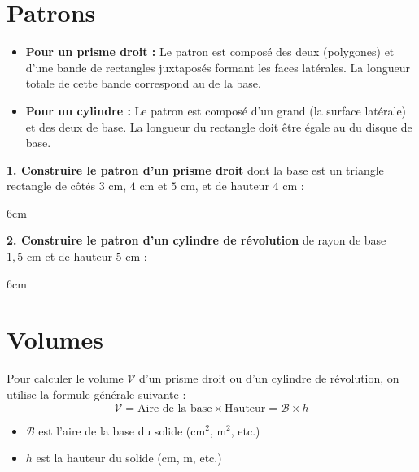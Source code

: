 \documentclass[a4paper]{book}
\begin{document}
\section{Patrons}

    \begin{methode}
        \begin{itemize}
            \item \textbf{Pour un prisme droit :} Le patron est composé des deux \points[5] (polygones) et d'une bande de rectangles juxtaposés formant les faces latérales. La longueur totale de cette bande correspond au \points[6] de la base.
            \item \textbf{Pour un cylindre :} Le patron est composé d'un grand \points[7] (la surface latérale) et des deux \points[5] de base. La longueur du rectangle doit être égale au \points[8] du disque de base.
        \end{itemize}
    \end{methode}

    \begin{exemple}
        \textbf{1. Construire le patron d'un prisme droit} dont la base est un triangle rectangle de côtés $3\text{ cm}$, $4\text{ cm}$ et $5\text{ cm}$, et de hauteur $4\text{ cm}$ :
    \end{exemple}
    \begin{ZoneReponse}{6cm}
    \end{ZoneReponse}

    \begin{exemple}
        \textbf{2. Construire le patron d'un cylindre de révolution} de rayon de base $1,5\text{ cm}$ et de hauteur $5\text{ cm}$ :
    \end{exemple}
    \begin{ZoneReponse}{6cm}
    \end{ZoneReponse}

\section{Volumes}

    \begin{propriete}
        Pour calculer le volume $\mathcal{V}$ d'un prisme droit ou d'un cylindre de révolution, on utilise la formule générale suivante :
        \[ \mathcal{V} = \text{Aire de la base} \times \text{Hauteur} = \mathcal{B} \times h \]
        \begin{itemize}
            \item $\mathcal{B}$ est l'aire de la base du solide ($\text{cm}^2$, $\text{m}^2$, etc.)
            \item $h$ est la hauteur du solide ($\text{cm}$, $\text{m}$, etc.)
        \end{itemize}
    \end{propriete}
\end{document}
